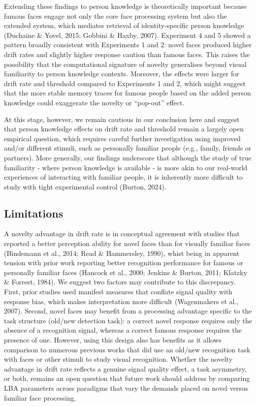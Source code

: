 \documentclass[
  letterpaper,
  DIV=11,
  numbers=noendperiod]{scrartcl}
\begin{document}
Extending these findings to person knowledge is theoretically important
because famous faces engage not only the core face processing system but
also the extended system, which mediates retrieval of identity-specific
person knowledge (Duchaine \& Yovel, 2015; Gobbini \& Haxby, 2007).
Experiment 4 and 5 showed a pattern broadly consistent with Experiments
1 and 2: novel faces produced higher drift rates and slightly higher
response caution than famous faces. This raises the possibility that the
computational signature of novelty generalises beyond visual familiarity
to person knowledge contexts. Moreover, the effects were larger for
drift rate and threshold compared to Experiments 1 and 2, which might
suggest that the more stable memory traces for famous people based on
the added person knowledge could exaggerate the novelty or ``pop-out''
effect.

At this stage, however, we remain cautious in our conclusion here and
suggest that person knowledge effects on drift rate and threshold remain
a largely open empirical question, which requires careful further
investigation using improved and/or different stimuli, such as
personally familiar people (e.g., family, friends or partners). More
generally, our findings underscore that although the study of true
familiarity - where person knowledge is available - is more akin to our
real-world experiences of interacting with familiar people, it is
inherently more difficult to study with tight experimental control
(Burton, 2024).

\subsection{Limitations}\label{limitations}

A novelty advantage in drift rate is in conceptual agreement with
studies that reported a better perception ability for novel faces than
for visually familiar faces (Bindemann et al., 2014; Read \& Hammersley,
1990), whist being in apparent tension with prior work reporting better
recognition performance for famous or personally familiar faces (Hancock
et al., 2000; Jenkins \& Burton, 2011; Klatzky \& Forrest, 1984). We
suggest two factors may contribute to this discrepancy. First, prior
studies used manifest measures that conflate signal quality with
response bias, which makes interpretation more difficult (Wagenmakers et
al., 2007). Second, novel faces may benefit from a processing advantage
specific to the task structure (old/new detection task): a correct novel
response requires only the absence of a recognition signal, whereas a
correct famous response requires the presence of one. However, using
this design also has benefits as it allows comparison to numerous
previous works that did use an old/new recognition task with faces or
other stimuli to study visual recognition. Whether the novelty advantage
in drift rate reflects a genuine signal quality effect, a task
asymmetry, or both, remains an open question that future work should
address by comparing LBA parameters across paradigms that vary the
demands placed on novel versus familiar face processing.
\end{document}
